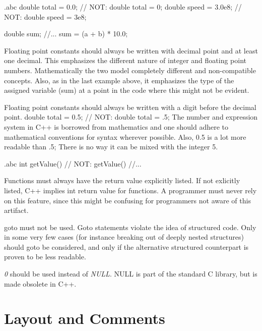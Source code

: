 \begin{filecontents*}{\jobname.abc}
	double total = 0.0;    // NOT:  double total = 0;
	double speed = 3.0e8;  // NOT:  double speed = 3e8;
	
	double sum;
	//...
	sum = (a + b) * 10.0;
\end{filecontents*}

\recommendation
{Floating point constants should always be written with decimal point and at least one decimal.}
{}
{
	This emphasizes the different nature of integer and floating point numbers. Mathematically the two model completely different and non-compatible concepts.\newline
	Also, as in the last example above, it emphasizes the type of the assigned variable (sum) at a point in the code where this might not be evident.
}

\recommendation
{Floating point constants should always be written with a digit before the decimal point.}
{double total = 0.5;  // NOT:  double total = .5;}
{The number and expression system in C++ is borrowed from mathematics and one should adhere to mathematical conventions for syntax wherever possible. Also, 0.5 is a lot more readable than .5; There is no way it can be mixed with the integer 5.}


\begin{filecontents*}{\jobname.abc}
	int getValue()   // NOT: getValue()
	{
		//...
	}
\end{filecontents*}

\recommendation
{Functions must always have the return value explicitly listed.}
{}
{If not exlicitly listed, C++ implies int return value for functions. A programmer must never rely on this feature, since this might be confusing for programmers not aware of this artifact.}

\recommendation
{goto must not be used.}
{}
{Goto statements violate the idea of structured code. Only in some very few cases (for instance breaking out of deeply nested structures) should goto be considered, and only if the alternative structured counterpart is proven to be less readable.}

\recommendation
{\textit{0} should be used instead of \textit{NULL}.}
{}
{NULL is part of the standard C library, but is made obsolete in C++.}

\section{Layout and Comments}
